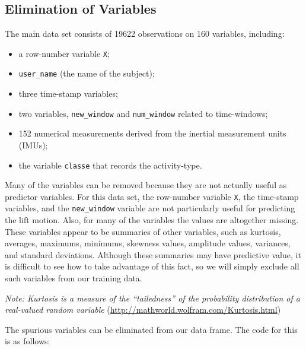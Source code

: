 \documentclass[12pt,twoside]{reedthesis}
\providecommand{\tightlist}{%
  \setlength{\itemsep}{0pt}\setlength{\parskip}{0pt}}
\begin{document}
  \newpage
  
  \subsection{Elimination of Variables}\label{elimination-of-variables}
  
  The main data set consists of 19622 observations on 160 variables,
  including:
  
  \begin{itemize}
  \tightlist
  \item
    a row-number variable \texttt{X};
  \item
    \texttt{user\_name} (the name of the subject);
  \item
    three time-stamp variables;
  \item
    two variables, \texttt{new\_window} and \texttt{num\_window} related
    to time-windows;
  \item
    152 numerical measurements derived from the inertial measurement units
    (IMUs);
  \item
    the variable \texttt{classe} that records the activity-type.
  \end{itemize}
  
  Many of the variables can be removed because they are not actually
  useful as predictor variables. For this data set, the row-number
  variable \texttt{X}, the time-stamp variables, and the
  \texttt{new\_window} variable are not particularly useful for predicting
  the lift motion. Also, for many of the variables the values are
  altogether missing. These variables appear to be summaries of other
  variables, such as kurtosis, averages, maximums, minimums, skewness
  values, amplitude values, variances, and standard deviations. Although
  these summaries may have predictive value, it is difficult to see how to
  take advantage of this fact, so we will simply exclude all such
  variables from our training data.
  
  \emph{Note: Kurtosis is a measure of the ``tailedness'' of the
  probability distribution of a real-valued random variable}
  (\url{http://mathworld.wolfram.com/Kurtosis.html})
  
  \newpage
  
  The spurious variables can be eliminated from our data frame. The code
  for this is as follows:
  
\end{document}
